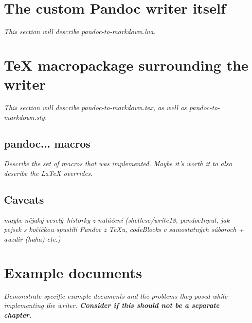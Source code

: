\documentclass[
  digital,     %
  oneside,     %
  nosansbold,  %
  nocolorbold, %
  lof,         %
  lot,         %
]{fithesis4}
\begin{document}
\section{The custom Pandoc writer itself}
\emph{
This section will describe pandoc-to-markdown.lua.
}

\section{\TeX{} macropackage surrounding the writer}
\emph{
This section will describe pandoc-to-markdown.tex, as well as pandoc-to-markdown.sty.
}

\subsection{pandoc... macros}
\emph{
Describe the set of macros that was implemented. Maybe it's worth it to also describe the \LaTeX{} overrides.
}

\subsection{Caveats}
\emph{maybe nějaký veselý historky z natáčení (shellesc/write18, pandocInput, jak pejsek s kočičkou spustili Pandoc z TeXu, codeBlocks v samostatných súboroch + auxdir (haha) etc.)}

\section{Example documents}
\emph{Demonstrate specific example documents and the problems they posed while implementing the writer. \label{fig:html-browsers-typeset} \textbf{Consider if this should not be a separate chapter.}}

% 

\end{document}
